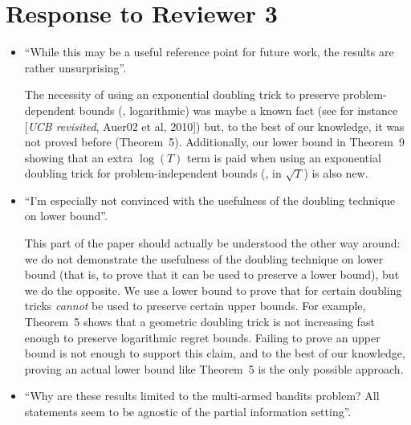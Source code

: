 \documentclass[anon,12pt]{colt2018} %
\begin{document}
\section{Response to Reviewer 3}

\begin{itemize}
    \item
    ``While this may be a useful reference point for future work, the results are rather unsurprising''.

    The necessity of using an exponential doubling trick to preserve problem-dependent bounds (\ie, logarithmic) was maybe a known fact (see for instance [\emph{UCB revisited}, Auer02 et al, 2010]) but, to the best of our knowledge, it was not proved before (Theorem~5).
    Additionally, our lower bound in Theorem~9 showing that an extra $\log(T)$ term is paid when using an exponential doubling trick for problem-independent bounds (\ie, in $\sqrt{T}$) is also new.

    \item
    ``I'm especially not convinced with the usefulness of the doubling technique on lower bound''.

    This part of the paper should actually be understood the other way around: we do not demonstrate the usefulness of the doubling technique on lower bound (that is, to prove that it can be used to preserve a lower bound), but we do the opposite.
    We use a lower bound to prove that for  certain doubling tricks \emph{cannot} be used to preserve certain upper bounds.
    For example, Theorem~5 shows that a geometric doubling trick is not increasing fast enough to preserve logarithmic regret bounds.
    Failing to prove an upper bound is not enough to support this claim, and to the best of our knowledge, proving an actual lower bound like Theorem~5 is the only possible approach.

    \item
    ``Why are these results limited to the multi-armed bandits problem? All statements seem to be agnostic of the partial information setting''.



\end{itemize}
\end{document}
